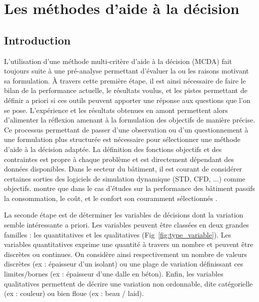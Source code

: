 
\section{Les méthodes d’aide à la décision} %
\label{sec:les_methodes_d_aide_à_la_decision}
\subsection{Introduction} %
\label{sub:introduction}


L’utilisation d’une méthode multi-critère d’aide à la décision (MCDA) fait toujours suite à une pré-analyse
permettant d’évaluer la ou les raisons motivant sa formulation.
À travers cette première étape, il est ainsi nécessaire de faire le bilan de la
performance actuelle, le résultats voulus, et les pistes permettant de définir a
priori si ces outils peuvent apporter une réponse aux questions que l’on se pose.
L’expérience et les résultats obtenues en amont permettent alors d’alimenter
la réflexion amenant à la formulation des objectifs de manière précise.
Ce processus permettant de passer d’une observation ou d’un questionnement à une
formulation plus structurée est nécessaire pour sélectionner une méthode d’aide à la décision
adaptée.
La définition des fonctions objectifs et des contraintes est propre à chaque problème
et est directement dépendant des données disponibles.
Dans le secteur du bâtiment, il est courant de considérer certaines sorties des
logiciels de simulation dynamique (STD, CFD, ...) comme objectifs.
 montre que dans le cas d’études sur la
performance des bâtiment passifs la consommation, le coût, et le confort son
couramment sélectionnés .

La seconde étape est de déterminer les variables de décisions dont la variation
semble intéressante a priori. Les variables peuvent être classées en deux grandes
familles : les quantitatives et les qualitatives (Fig~\ref{fig:type_variable}).
Les variables quantitatives exprime une quantité à travers un nombre et
peuvent être discrètes ou continues. On considère ainsi respectivement un nombre de
valeurs discrètes (ex : épaisseur d’un isolant) ou une plage de variation définissant
ces limites/bornes (ex : épaisseur d’une dalle en béton).
Enfin, les variables qualitatives permettent de décrire une variation non ordonnable,
dite catégorielle (ex : couleur) ou bien floue (ex : beau / laid).

